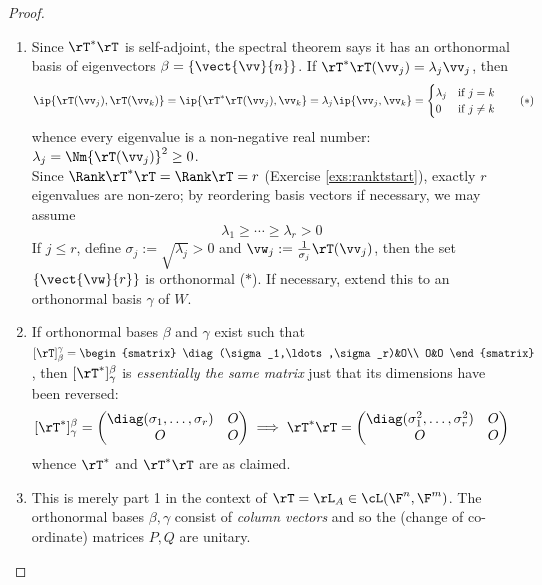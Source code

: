 \goodbreak

\begin{proof}
\begin{enumerate}
  \item Since $\rT^*\rT$ is self-adjoint, the spectral theorem says it has an orthonormal basis of eigenvectors $\beta=\{\vect{\vv}{n}\}$. If $\rT^*\rT(\vv_j)=\lambda_j\vv_j$, then
	\[\ip{\rT(\vv_j),\rT(\vv_k)}=\ip{\rT^*\rT(\vv_j),\vv_k} =\lambda_j\ip{\vv_j,\vv_k} =\begin{cases}
	\lambda_j&\text{if }j=k\\
	0&\text{if }j\neq k
	\end{cases} \tag{$\ast$}\]
	whence every eigenvalue is a non-negative real number: $\lambda_j=\Nm{\rT(\vv_j)}^2\ge 0$.\\
	Since $\Rank\rT^*\rT=\Rank\rT=r$ (Exercise \ref{exs:ranktstart}), exactly $r$ eigenvalues are non-zero; by reordering basis vectors if necessary, we may assume
	\[\lambda_1\ge\cdots\ge\lambda_r>0\]
	If $j\le r$, define $\sigma_j:=\sqrt{\lambda_j}>0$ and $\vw_j:=\frac 1{\sigma_j}\rT(\vv_j)$, then the set $\{\vect{\vw}{r}\}$ is orthonormal ($\ast$). If necessary, extend this to an orthonormal basis $\gamma$ of $W$.
	\item If orthonormal bases $\beta$ and $\gamma$ exist such that $[\rT]_\beta^\gamma=\begin{smatrix}
	\diag(\sigma_1,\ldots,\sigma_r)&O\\
	O&O
	\end{smatrix}$, then $[\rT^*]_\gamma^\beta$ is \emph{essentially the same matrix} just that its dimensions have been reversed:
	\[[\rT^*]_\gamma^\beta=\begin{pmatrix}
	\diag(\sigma_1,\ldots,\sigma_r)&O\\
	O&O
	\end{pmatrix} \implies \rT^*\rT=\begin{pmatrix}
	\diag(\sigma_1^2,\ldots,\sigma_r^2)&O\\
	O&O
	\end{pmatrix}\]
	whence $\rT^*$ and $\rT^*\rT$ are as claimed.
	
	\item This is merely part 1 in the context of $\rT=\rL_A\in\cL(\F^n,\F^m)$. The orthonormal bases $\beta,\gamma$ consist of \emph{column vectors} and so the (change of co-ordinate) matrices $P,Q$ are unitary.\qedhere
\end{enumerate}
\end{proof}




